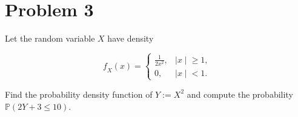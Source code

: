 \section{Problem 3}\label{hw02-problem-3}

Let the random variable \(\mathit{X}\) have density

\[\mathit{f}_{\mathit{X}}(\mathit{x}) = \left\{ \begin{matrix}
{\frac{1}{2\mathit{x}^{2}},} & \left. |\mathit{x} \middle| \geq 1, \right. \\
{0,} & \left. |\mathit{x} \middle| < 1. \right.
\end{matrix} \right.\]

Find the probability density function of \(\mathit{Y} := \mathit{X}^{2}\) and compute the probability \(\mathbb{P}(2\mathit{Y} + 3 \leq 10)\).

